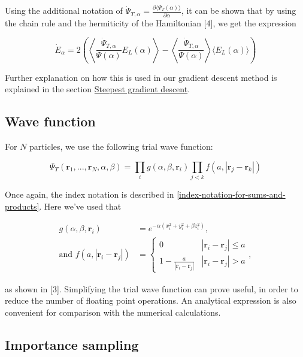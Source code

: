 \documentclass[
]{article}
\begin{document}
Using the additional notation of
\(\dot \Psi_{T, \alpha} = \frac{\partial \langle \Psi_T(\alpha)\rangle}{\partial \alpha}\),
it can be shown that by using the chain rule and the hermiticity of the
Hamiltonian {[}4{]}, we get the expression

\begin{equation} \dot E_\alpha = 2\left(\left\langle\frac{\dot \Psi_{T, \alpha}}{\Psi(\alpha)} E_L(\alpha)\right\rangle - \left\langle\frac{\dot \Psi_{T, \alpha}}{\Psi(\alpha)}\right\rangle \langle E_L(\alpha)\rangle\right) \label{eq:energy-deriv}\end{equation}

Further explanation on how this is used in our gradient descent method
is explained in the section
\protect\hyperlink{steepest-gradient-descent}{Steepest gradient
descent}.

\hypertarget{wave-function}{%
\subsection{Wave function}\label{wave-function}}

For \(N\) particles, we use the following trial wave function:

\begin{equation}\Psi_T(\mathbf r_1, ..., \mathbf r_N, \alpha, \beta) = \prod_i g(\alpha, \beta, \mathbf r_i) \prod_{j < k}f(a, |\mathbf r_j - \mathbf r_k|)\label{eq:trial-wavefunction}\end{equation}

Once again, the index notation is described in
\ref{index-notation-for-sums-and-products}. Here we've used that

\begin{align*}
g(\alpha,\beta,\mathbf{r}_i) &= e^{-\alpha(x_i^2+y_i^2+\beta z_i^2)}, \\
\text{and }f(a,|\mathbf r_i-\mathbf r_j|) &= \begin{cases} 0 & |\mathbf r_i-\mathbf r_j| \le a \\ 1-\frac{a}{|\mathbf r_i-\mathbf r_j|} & {|\mathbf r_i-\mathbf r_j|} > a \end{cases},
\end{align*}

as shown in {[}3{]}. Simplifying the trial wave function can prove
useful, in order to reduce the number of floating point operations. An
analytical expression is also convenient for comparison with the
numerical calculations.

\hypertarget{importance-sampling}{%
\subsection{Importance sampling}\label{importance-sampling}}
\end{document}
